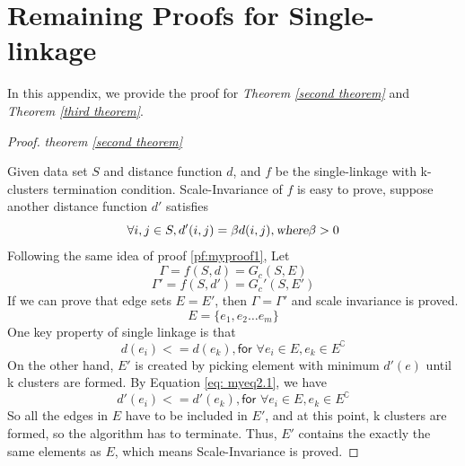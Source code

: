 \documentclass{uonmathreport}
\begin{document}
\section{Remaining Proofs for Single-linkage} \label{app:proof}
In this appendix, we provide the proof for \textit{Theorem \ref{second theorem}} and  \textit{Theorem \ref{third theorem}}.
\begin{proof}
\textit{theorem \ref{second theorem}}

\noindent Given data set $S$ and distance function $d$, and $f$ be the single-linkage with k-clusters termination condition. Scale-Invariance of $f$ is easy to prove, suppose another distance function $d'$ satisfies
\begin{equation}
\label{eq: myeq2.1}
	\forall i,j \in S, d'(i,j)=\beta d(i,j), \textsl{where} \beta >0
\end{equation}
Following the same idea of proof \ref{pf:myproof1}, Let 
\begin{equation}
\label{eq: myeq2.2}
\Gamma = f(S,d) = G_c(S,E)
\end{equation}
\begin{equation}
\Gamma' = f(S,d') = G_c'(S,E')
\end{equation}
If we can prove that edge sets $E=E'$, then $\Gamma = \Gamma'$ and scale invariance is proved.  
\begin{equation}
E = \{e_1,e_2\ldots e_m\}
\end{equation}
One key property of single linkage is that 
\begin{equation}
 d(e_i)<=d(e_k), \textsf{for } \forall e_i\in E, e_k\in E^\complement
\end{equation}
On the other hand, $E'$ is created by picking element with minimum  $d'(e)$ until k clusters are formed. By Equation \ref{eq: myeq2.1}, we have  
 \begin{equation}
 d'(e_i)<=d'(e_k), \textsf{for } \forall e_i\in E, e_k\in E^\complement
\end{equation}
So all the edges in $E$ have to be included in $E'$, and at this point, k clusters are formed, so the algorithm has to terminate. Thus, $E'$ contains the exactly the same elements as $E$, which means Scale-Invariance is proved.


\end{proof}
\end{document}
